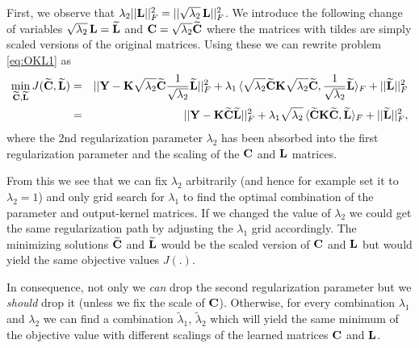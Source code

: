 First, we observe that $\lambda_2 ||\mathbf{L}||_F^2 = ||\sqrt{\lambda_2} \, \mathbf{L}||_F^2$.
We introduce the following change of variables $\sqrt{\lambda_2} \, \mathbf{L} = \mathbf{\widetilde{L}}$ and $\mathbf{C} = \sqrt{\lambda_2} \mathbf{\widetilde{C}}$ where the matrices with tildes are simply scaled versions of the original matrices.
Using these we can rewrite problem \eqref{eq:OKL1} as
\begin{eqnarray}\label{eq:OKL2}
 \min_{\mathbf{\widetilde{C}},\mathbf{\widetilde{L}}} J(\mathbf{\widetilde{C}},\mathbf{\widetilde{L}}) 
& = & || \mathbf{Y} - \mathbf{K} \sqrt{\lambda_2} \mathbf{\widetilde{C}} \frac{1}{\sqrt{\lambda_2}} \mathbf{\widetilde{L}} ||_F^2 
+ \lambda_1 \, \langle \sqrt{\lambda_2} \mathbf{\widetilde{C}} \mathbf{K} \sqrt{\lambda_2} \mathbf{\widetilde{C}}, \frac{1}{\sqrt{\lambda_2}} \mathbf{\widetilde{L}}\rangle_F  
+ ||\mathbf{\widetilde{L}}||_F^2 \nonumber \\
& = & || \mathbf{Y} - \mathbf{K} \mathbf{\widetilde{C}} \mathbf{\widetilde{L}} ||_F^2 
+ \lambda_1 \sqrt{\lambda_2} \, \langle \mathbf{\widetilde{C}} \mathbf{K} \mathbf{\widetilde{C}}, \mathbf{\widetilde{L}}\rangle_F  
+ ||\mathbf{\widetilde{L}}||_F^2,
\end{eqnarray}
where the 2nd regularization parameter $\lambda_2$ has been absorbed into the first regularization parameter and the scaling of the $\mathbf{C}$ and $\mathbf{L}$ matrices.

From this we see that we can fix $\lambda_2$ arbitrarily (and hence for example set it to $\lambda_2 = 1$) and only grid search for $\lambda_1$ to find the optimal combination of the parameter and output-kernel matrices.
If we changed the value of $\lambda_2$ we could get the same regularization path by adjusting the $\lambda_1$ grid accordingly. The minimizing solutions $\mathbf{\widetilde{C}}$ and $\mathbf{\widetilde{L}}$ would be the scaled version of $\mathbf{C}$ and $\mathbf{L}$ but would yield the same objective values $J(.)$.

In consequence, not only we \emph{can} drop the second regularization parameter but we \emph{should} drop it (unless we fix the scale of $\mathbf{C}$).
Otherwise, for every combination $\lambda_1$ and $\lambda_2$ we can find a combination $\tilde{\lambda}_1$, $\tilde{\lambda}_2$ which will yield the same minimum of the objective value with different scalings of the learned matrices $\mathbf{C}$ and $\mathbf{L}$.

